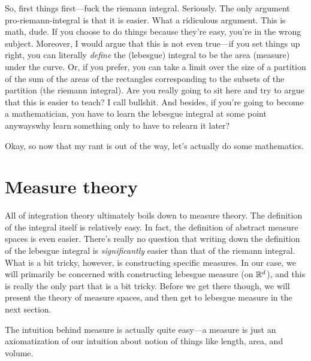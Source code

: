 So, first things first---fuck the riemann integral.  Seriously.  The only argument pro-riemann-integral is that it is easier.  What a ridiculous argument.  This is math, dude.  If you choose to do things because they're easy, you're in the wrong subject.  Moreover, I would argue that this is not even true---if you set things up right, you can literally \emph{define} the (lebesgue) integral to be the area (measure) under the curve.  Or, if you prefer, you can take a limit over the size of a partition of the sum of the areas of the rectangles corresponding to the subsets of the partition (the riemann integral).  Are you really going to sit here and try to argue that this is easier to teach?  I call bullshit.  And besides, if you're going to become a mathematician, you have to learn the lebesgue integral at some point anyways\textellipsis why learn something only to have to relearn it later?

Okay, so now that my rant is out of the way, let's actually do some mathematics.

\section{Measure theory}

All of integration theory ultimately boils down to measure theory.  The definition of the integral itself is relatively easy.  In fact, the definition of abstract measure spaces is even easier.  There's really no question that writing down the definition of the lebesgue integral is \emph{significantly} easier than that of the riemann integral.  What is a bit tricky, however, is constructing specific measures.  In our case, we will primarily be concerned with constructing lebesgue measure (on $\mathbb{R} ^d$), and this is really the only part that is a bit tricky.  Before we get there though, we will present the theory of measure spaces, and then get to lebesgue measure in the next section.

The intuition behind measure is actually quite easy---a measure is just an axiomatization of our intuition about notion of things like length, area, and volume.  

